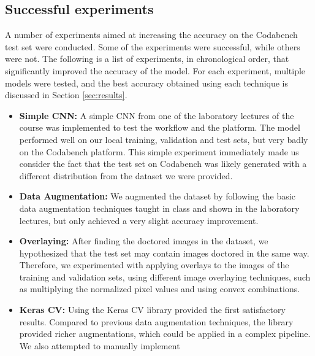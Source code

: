 \documentclass[11pt]{article}
\begin{document}
\begin{multicols}{2}
      \subsection{Successful experiments}

      A number of experiments aimed at increasing the accuracy on the Codabench test
      set were conducted. Some of the experiments were successful, while others were not. 
      The following is a list of experiments, in chronological order, that significantly
      improved the accuracy of the model. For each experiment, multiple models were tested,
      and the best accuracy obtained using each technique is discussed in Section 
      \ref{sec:results}.

      \begin{itemize}
            \item \textbf{Simple CNN:} A simple CNN from one of the laboratory lectures
                  of the course was implemented to test the workflow and the platform.
                  The model performed well on our local training, validation and test 
                  sets, but very badly on the Codabench platform. This simple experiment 
                  immediately made us consider the fact that the test set on Codabench 
                  was likely generated with a different distribution from the dataset 
                  we were provided.
            \item \textbf{Data Augmentation:} We augmented the dataset by
                  following the basic data augmentation techniques taught in class and
                  shown in the laboratory lectures, but only achieved a very slight
                  accuracy improvement.
            \item \textbf{Overlaying:} After finding the doctored images in the
                  dataset, we hypothesized that the test set may contain images
                  doctored in the same way. Therefore, we experimented with applying
                  overlays to the images of the training and validation sets, using
                  different image overlaying techniques, such as multiplying the 
                  normalized pixel values and using convex combinations.
            \item \textbf{Keras CV:} Using the Keras CV library provided the first
                  satisfactory results. Compared to previous data augmentation techniques,
                  the library provided richer augmentations, which could be applied
                  in a complex pipeline. We also attempted to manually implement

\end{itemize}
\end{multicols}
\end{document}

